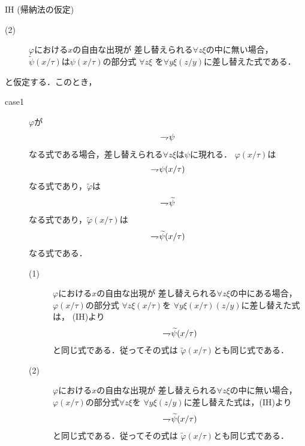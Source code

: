 \begin{metaprf}
\begin{description}
\begin{itembox}[l]{IH (帰納法の仮定)}
\begin{description}
						\item[(2)] $\varphi$における$x$の自由な出現が
							差し替えられる$\forall z \xi$の中に無い場合，
							$\widetilde{\psi}(x/\tau)$は$\psi(x/\tau)$の部分式
							$\forall z \xi$ を$\forall y \xi(z/y)$に差し替えた式である．
					\end{description}
				\end{itembox}
				と仮定する．このとき，
				\begin{description}
					\item[case1] $\varphi$が
						\begin{align}
							\rightharpoondown\hspace{-0.25em} \psi
						\end{align}
						なる式である場合，差し替えられる$\forall z \xi$は$\psi$に現れる．
						$\varphi(x/\tau)$は
						\begin{align}
							\rightharpoondown\hspace{-0.25em} \psi(x/\tau)
						\end{align}
						なる式であり，$\widetilde{\varphi}$は
						\begin{align}
							\rightharpoondown\hspace{-0.25em} \widetilde{\psi}
						\end{align}
						なる式であり，$\widetilde{\varphi}(x/\tau)$は
						\begin{align}
							\rightharpoondown\hspace{-0.25em} \widetilde{\psi}(x/\tau)
						\end{align}
						なる式である．
						\begin{description}
							\item[(1)] $\varphi$における$x$の自由な出現が
								差し替えられる$\forall z \xi$の中にある場合，
								$\varphi(x/\tau)$の部分式
								$\forall z \xi(x/\tau)$を
								$\forall y \xi(x/\tau)(z/y)$に差し替えた式は，
								(IH)より
								\begin{align}
									\rightharpoondown\hspace{-0.25em} \widetilde{\psi}(x/\tau)
								\end{align}
								と同じ式である．従ってその式は
								$\widetilde{\varphi}(x/\tau)$とも同じ式である．
								
							\item[(2)] $\varphi$における$x$の自由な出現が
								差し替えられる$\forall z \xi$の中に無い場合，
								$\varphi(x/\tau)$の部分式$\forall z \xi$を
								$\forall y \xi(z/y)$に差し替えた式は，(IH)より
								\begin{align}
									\rightharpoondown\hspace{-0.25em} \widetilde{\psi}(x/\tau)
								\end{align}
								と同じ式である．従ってその式は
								$\widetilde{\varphi}(x/\tau)$とも同じ式である．
						\end{description}
						

\end{description}
\end{description}
\end{metaprf}
